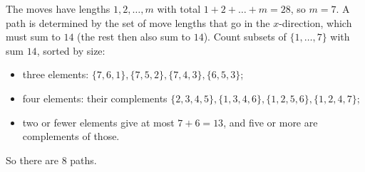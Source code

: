 The moves have lengths $1,2,\dots,m$ with total $1+2+\dots+m=28$, so $m=7$. A path is determined by the set of move lengths that go in the $x$-direction, which must sum to $14$ (the rest then also sum to $14$). Count subsets of $\{1,\dots,7\}$ with sum $14$, sorted by size:
\begin{itemize}
\item three elements: $\{7,6,1\},\{7,5,2\},\{7,4,3\},\{6,5,3\}$;
\item four elements: their complements $\{2,3,4,5\},\{1,3,4,6\},\{1,2,5,6\},\{1,2,4,7\}$;
\item two or fewer elements give at most $7+6=13$, and five or more are complements of those.
\end{itemize}
So there are $\boxed{8}$ paths.
